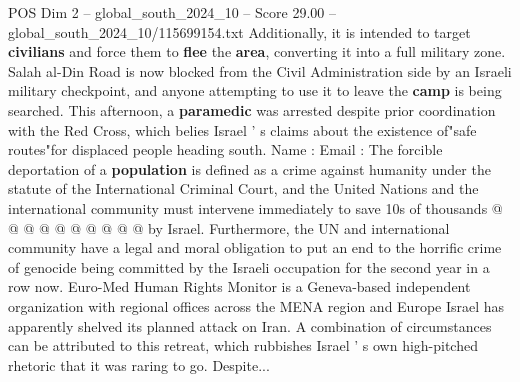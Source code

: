 \begin{textsample}{POS Dim 2 – global\_south\_2024\_10 – Score 29.00 – global\_south\_2024\_10/115699154.txt}
Additionally, it is intended to target \textbf{civilians} and force them to \textbf{flee} the \textbf{area}, converting it into a full military zone.
Salah al-Din Road is now blocked from the Civil Administration side by an Israeli military checkpoint, and anyone attempting to use it to leave the \textbf{camp} is being searched.
This afternoon, a \textbf{paramedic} was arrested despite prior coordination with the Red Cross, which belies Israel ' s claims about the existence of"safe routes"for displaced people heading south.
Name : Email : The forcible deportation of a \textbf{population} is defined as a crime against humanity under the statute of the International Criminal Court, and the United Nations and the international community must intervene immediately to save 10s of thousands @ @ @ @ @ @ @ @ @ @ by Israel.
Furthermore, the UN and international community have a legal and moral obligation to put an end to the horrific crime of genocide being committed by the Israeli occupation for the second year in a row now.
Euro-Med Human Rights Monitor is a Geneva-based independent organization with regional offices across the MENA region and Europe Israel has apparently shelved its planned attack on Iran.
A combination of circumstances can be attributed to this retreat, which rubbishes Israel ' s own high-pitched rhetoric that it was raring to go.
Despite...

\end{textsample}
